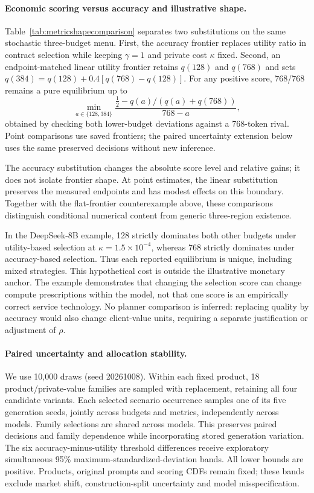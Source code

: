 \documentclass{article}
\begin{document}
\paragraph{Economic scoring versus accuracy and illustrative shape.}
Table~\ref{tab:metricshapecomparison} separates two substitutions on the same stochastic three-budget menu. First, the accuracy frontier replaces utility ratio in contract selection while keeping $\gamma=1$ and private cost $\kappa$ fixed. Second, an endpoint-matched linear utility frontier retains $q(128)$ and $q(768)$ and sets $q(384)=q(128)+0.4[q(768)-q(128)]$. For any positive score, 768/768 remains a pure equilibrium up to
\[
\min_{a\in\{128,384\}}
\frac{\tfrac12-q(a)/(q(a)+q(768))}{768-a},
\]
obtained by checking both lower-budget deviations against a 768-token rival. Point comparisons use saved frontiers; the paired uncertainty extension below uses the same preserved decisions without new inference.

The accuracy substitution changes the absolute score level and relative gains; it does not isolate frontier shape. At point estimates, the linear substitution preserves the measured endpoints and has modest effects on this boundary. Together with the flat-frontier counterexample above, these comparisons distinguish conditional numerical content from generic three-region existence.

In the DeepSeek-8B example, 128 strictly dominates both other budgets under utility-based selection at $\kappa=1.5\times10^{-4}$, whereas 768 strictly dominates under accuracy-based selection. Thus each reported equilibrium is unique, including mixed strategies. This hypothetical cost is outside the illustrative monetary anchor. The example demonstrates that changing the selection score can change compute prescriptions within the model, not that one score is an empirically correct service technology. No planner comparison is inferred: replacing quality by accuracy would also change client-value units, requiring a separate justification or adjustment of $\rho$.


\paragraph{Paired uncertainty and allocation stability.}
We use 10,000 draws (seed 20261008). Within each fixed product, 18 product/private-value families are sampled with replacement, retaining all four candidate variants. Each selected scenario occurrence samples one of its five generation seeds, jointly across budgets and metrics, independently across models. Family selections are shared across models. This preserves paired decisions and family dependence while incorporating stored generation variation. The six accuracy-minus-utility threshold differences receive exploratory simultaneous 95\% maximum-standardized-deviation bands. All lower bounds are positive. Products, original prompts and scoring CDFs remain fixed; these bands exclude market shift, construction-split uncertainty and model misspecification.
\end{document}
